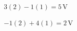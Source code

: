 \documentclass[border=12pt]{standalone}
\begin{document}
\color{weeknavy}
\parbox{11cm}{\centering $\displaystyle 3(2)-1(1)=5\,\mathrm V$}
\vspace{4pt}
\parbox{11cm}{\centering $\displaystyle -1(2)+4(1)=2\,\mathrm V$}
\end{document}

